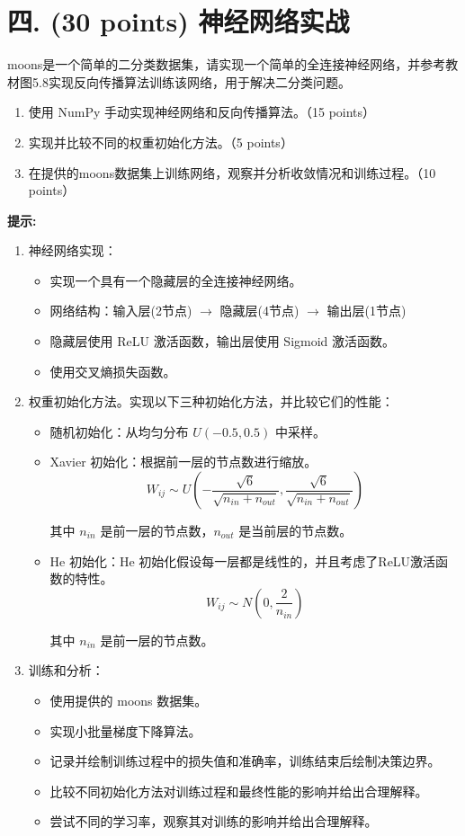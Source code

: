 \documentclass[8pt]{article}
\begin{document}
\vspace{3em}

\section*{四. (30 points) 神经网络实战}
moons是一个简单的二分类数据集，请实现一个简单的全连接神经网络，并参考教材图5.8实现反向传播算法训练该网络，用于解决二分类问题。
\begin{enumerate}
    \item 使用 NumPy 手动实现神经网络和反向传播算法。（15 points）
    \item 实现并比较不同的权重初始化方法。（5 points）
    \item 在提供的moons数据集上训练网络，观察并分析收敛情况和训练过程。（10 points）
\end{enumerate}

\textbf{提示:}

\begin{enumerate}
    \item 神经网络实现：
\begin{itemize}
    \item 实现一个具有一个隐藏层的全连接神经网络。
    \item 网络结构：输入层(2节点) $\rightarrow$ 隐藏层(4节点) $\rightarrow$ 输出层(1节点)
    \item 隐藏层使用 ReLU 激活函数，输出层使用 Sigmoid 激活函数。
    \item 使用交叉熵损失函数。
\end{itemize}
    \item 权重初始化方法。实现以下三种初始化方法，并比较它们的性能：
\begin{itemize}
    \item 随机初始化：从均匀分布 $U(-0.5, 0.5)$ 中采样。
    \item Xavier 初始化：根据前一层的节点数进行缩放。
    \[ W_{ij} \sim U\left( -\frac{\sqrt{6}}{\sqrt{n_{in} + n_{out}}}, \frac{\sqrt{6}}{\sqrt{n_{in} + n_{out}}} \right) \]

其中 \(n_{in}\) 是前一层的节点数，\(n_{out}\) 是当前层的节点数。
    \item He 初始化：He 初始化假设每一层都是线性的，并且考虑了ReLU激活函数的特性。\[ W_{ij} \sim N\left( 0, \frac{2}{n_{in}} \right) \]

其中 \(n_{in}\) 是前一层的节点数。
\end{itemize}
    \item 训练和分析：
\begin{itemize}
    \item 使用提供的 moons 数据集。
    \item 实现小批量梯度下降算法。
    \item 记录并绘制训练过程中的损失值和准确率，训练结束后绘制决策边界。
    \item 比较不同初始化方法对训练过程和最终性能的影响并给出合理解释。
    \item 尝试不同的学习率，观察其对训练的影响并给出合理解释。
\end{itemize}
\end{enumerate}
\end{document}
